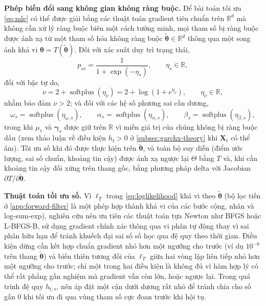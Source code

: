 \documentclass[12pt,a4paper]{article}
\numberwithin{equation}{section}
\newcommand{\bm}[1]{\symbf{#1}}
\newcommand{\Param}{\bm{\theta}}
\newcommand{\Xvec}{\bm{X}}
\newcommand{\R}{\mathbb{R}}
\newcommand{\softplus}{\operatorname{softplus}}
\begin{document}
\textbf{Phép biến đổi sang không gian không ràng buộc.}
Để bài toán tối ưu \cref{eq:mle} có thể được giải bằng các thuật toán gradient tiêu chuẩn trên $\R^d$ mà không cần xử lý ràng buộc biên một cách tường minh, mọi tham số bị ràng buộc được ánh xạ từ một tham số hóa không ràng buộc $\widetilde{\Param}\in\R^d$ thông qua một song ánh khả vi $\Param=T(\widetilde{\Param})$. Đối với xác suất duy trì trạng thái,
\begin{equation}
  p_{ss}=\frac{1}{1+\exp(-\eta_s)},
  \qquad \eta_s\in\R,
  \label{eq:logit-transition}
\end{equation}
đối với bậc tự do,
\begin{equation}
  \nu=2+\softplus(\eta_{\nu})
  =2+\log\left(1+e^{\eta_{\nu}}\right),
  \qquad \eta_{\nu}\in\R,
  \label{eq:df-transform}
\end{equation}
nhằm bảo đảm $\nu>2$; và đối với các hệ số phương sai cần dương,
\begin{equation}
  \omega_s=\softplus(\eta_{\omega,s}),
  \qquad
  \alpha_s=\softplus(\eta_{\alpha,s}),
  \qquad
  \beta_s=\softplus(\eta_{\beta,s}),
  \label{eq:variance-coef-transform}
\end{equation}
trong khi $\mu_s$ và $\bm\gamma_s$ được giữ trên $\R$ vì miền giá trị của chúng không bị ràng buộc dấu (xem thảo luận về điều kiện $h_t>0$ ở \cref{subsec:garchx-theory} khi $\Xvec_t$ có thể âm). Tối ưu số khi đó được thực hiện trên $\widetilde{\Param}$, và toàn bộ suy diễn (điểm ước lượng, sai số chuẩn, khoảng tin cậy) được ánh xạ ngược lại $\Theta$ bằng $T$ và, khi cần khoảng tin cậy đối xứng trên thang gốc, bằng phương pháp delta với Jacobian $\partial T/\partial\widetilde{\Param}$.

\textbf{Thuật toán tối ưu số.}
Vì $\ell_T$ trong \cref{eq:loglikelihood} khả vi theo $\widetilde{\Param}$ (bộ lọc tiến ở \cref{app:forward-filter} là một phép hợp thành khả vi của các bước cộng, nhân và log-sum-exp), nghiên cứu nên ưu tiên các thuật toán tựa Newton như BFGS hoặc L-BFGS-B, sử dụng gradient chính xác thông qua vi phân tự động thay vì sai phân hữu hạn để tránh khuếch đại sai số số học qua đệ quy theo thời gian. Điều kiện dừng cần kết hợp chuẩn gradient nhỏ hơn một ngưỡng cho trước (ví dụ $10^{-6}$ trên thang $\widetilde{\Param}$) và biến thiên tương đối của $\ell_T$ giữa hai vòng lặp liên tiếp nhỏ hơn một ngưỡng cho trước; chỉ một trong hai điều kiện là không đủ vì hàm hợp lý có thể rất phẳng gần nghiệm mà gradient vẫn còn lớn, hoặc ngược lại. Trong quá trình đệ quy $h_{t,s}$, nên áp đặt một cận dưới dương rất nhỏ để tránh chia cho số gần $0$ khi tối ưu đi qua vùng tham số cực đoan trước khi hội tụ.
\end{document}
